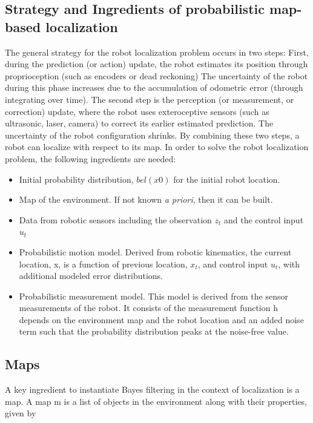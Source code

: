 \documentclass[twoside]{article}
\begin{document}
\subsection{Strategy and Ingredients of probabilistic map-based localization}

The general strategy for the robot localization problem occurs in two steps: First, during the prediction (or
action) update, the robot estimates its position through proprioception (such as encoders or dead reckoning)
The uncertainty of the robot during this phase increases due to the accumulation of odometric error
(through integrating over time). The second step is the perception (or measurement, or correction) update,
where the robot uses exteroceptive sensors (such as ultrasonic, laser, camera) to correct its earlier estimated
prediction. The uncertainty of the robot configuration shrinks. By combining these two steps, a robot can
localize with respect to its map.
In order to solve the robot localization problem, the following ingredients are needed:

\begin{itemize}
    \item Initial probability distribution, $bel(x0)$ for the initial robot location.
    \item Map of the environment. If not known \emph{a priori}, then it can be built.
    \item Data from robotic sensors including the observation $z_t$ and the control input $u_t$
    \item Probabilistic motion model. Derived from robotic kinematics, the current location, x, is a function of previous location, $x_t$, and control input $u_t$, with additional modeled error distributions.
    \item Probabilistic measurement model. This model is derived from the sensor measurements of the robot. It consists of the measurement function h depends on the environment map and the robot location and an added noise term such that the probability distribution peaks at the noise-free value.
\end{itemize}

\subsection{Maps}
A key ingredient to instantiate Bayes filtering in the context of localization is a map. A map m is a list of
objects in the environment along with their properties, given by
\end{document}
